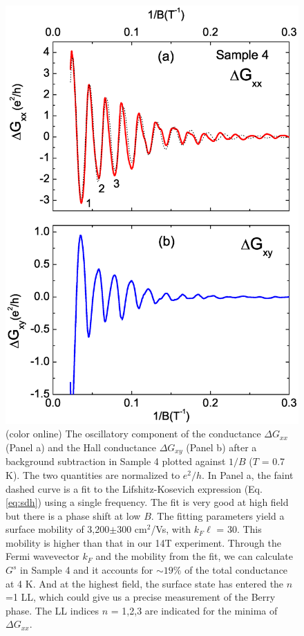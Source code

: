 \begin{figure}[!htbp]
  \begin{center}
\includegraphics[width=0.8\linewidth]{ch-bts/figures/FigDG.eps}
\caption{\label{figG} (color online)
The oscillatory component of the conductance $\Delta G_{xx}$ (Panel a) and the 
Hall conductance $\Delta G_{xy}$ (Panel b) after a background subtraction in Sample 4 plotted against $1/B$ ($T$ = 0.7 K). The two quantities
are normalized to $e^2/h$. In Panel a, the faint dashed curve is a fit 
to the Lifshitz-Kosevich expression (Eq. \ref{eq:sdh}) using a single frequency. The fit is very good at high field but there is a phase shift at low $B$. The fitting parameters yield a surface mobility of 3,200$\pm$300 cm$^2$/Vs, with $k_F\ell$ = 30. This mobility is higher than that in our 14T experiment. Through the Fermi wavevector $k_F$ and the mobility from the fit, we can calculate $G^s$ in Sample 4 and it accounts for $\sim 19\%$ of the total conductance at 4 K. And at the highest field, the surface state has entered the $n$=1 LL, which could give us a precise measurement of the Berry phase.
The LL indices $n$ = 1,2,3 are indicated for the 
minima of $\Delta G_{xx}$. 
}
  \end{center}
\end{figure}

